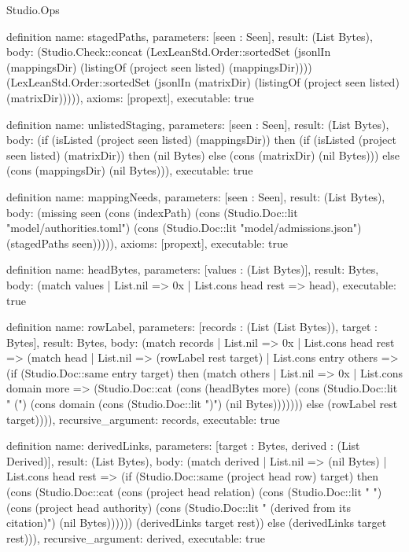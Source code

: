 \begin{lexlean}{Studio.Ops}
\begin{semanticmodule}
{definition{
  name: stagedPaths,
  parameters: [seen : Seen],
  result: (List Bytes),
  body: (Studio.Check::concat (LexLeanStd.Order::sortedSet (jsonlIn (mappingsDir) (listingOf (project seen listed) (mappingsDir)))) (LexLeanStd.Order::sortedSet (jsonlIn (matrixDir) (listingOf (project seen listed) (matrixDir))))),
  axioms: [propext],
  executable: true
}

definition{
  name: unlistedStaging,
  parameters: [seen : Seen],
  result: (List Bytes),
  body: (if (isListed (project seen listed) (mappingsDir)) then (if (isListed (project seen listed) (matrixDir)) then (nil Bytes) else (cons (matrixDir) (nil Bytes))) else (cons (mappingsDir) (nil Bytes))),
  executable: true
}

definition{
  name: mappingNeeds,
  parameters: [seen : Seen],
  result: (List Bytes),
  body: (missing seen (cons (indexPath) (cons (Studio.Doc::lit "model/authorities.toml") (cons (Studio.Doc::lit "model/admissions.json") (stagedPaths seen))))),
  axioms: [propext],
  executable: true
}

definition{
  name: headBytes,
  parameters: [values : (List Bytes)],
  result: Bytes,
  body: (match values
    | List.nil => 0x
    | List.cons head rest => head),
  executable: true
}

definition{
  name: rowLabel,
  parameters: [records : (List (List Bytes)), target : Bytes],
  result: Bytes,
  body: (match records
    | List.nil => 0x
    | List.cons head rest => (match head
      | List.nil => (rowLabel rest target)
      | List.cons entry others => (if (Studio.Doc::same entry target) then (match others
        | List.nil => 0x
        | List.cons domain more => (Studio.Doc::cat (cons (headBytes more) (cons (Studio.Doc::lit " (") (cons domain (cons (Studio.Doc::lit ")") (nil Bytes))))))) else (rowLabel rest target)))),
  recursive_argument: records,
  executable: true
}

definition{
  name: derivedLinks,
  parameters: [target : Bytes, derived : (List Derived)],
  result: (List Bytes),
  body: (match derived
    | List.nil => (nil Bytes)
    | List.cons head rest => (if (Studio.Doc::same (project head row) target) then (cons (Studio.Doc::cat (cons (project head relation) (cons (Studio.Doc::lit " ") (cons (project head authority) (cons (Studio.Doc::lit " (derived from its citation)") (nil Bytes)))))) (derivedLinks target rest)) else (derivedLinks target rest))),
  recursive_argument: derived,
  executable: true
}

}
\end{semanticmodule}
\end{lexlean}
